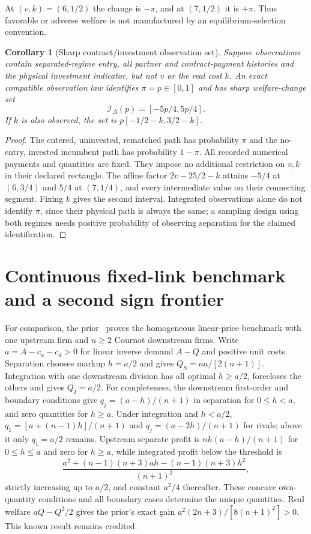 \documentclass[11pt,a4paper]{article}
\numberwithin{equation}{section}
\newtheorem{corollary}[theorem]{Corollary}
\theoremstyle{definition}
\begin{document}
At $(v,k)=(6,1/2)$ the change is $-\pi$, and at $(7,1/2)$ it is
$+\pi$. Thus favorable or adverse welfare is not manufactured by an
equilibrium-selection convention.

\begin{corollary}[Sharp contract/investment observation set]\label{cor:dynamic-data}
Suppose observations contain separated-regime entry, all partner and
contract-payment histories and the physical investment indicator, but
not $v$ or the real cost $k$. An exact compatible observation law identifies
$\pi=p\in[0,1]$ and has sharp welfare-change set
\begin{equation}\label{eq:dynamic-id}
 \mathcal I_\Delta(p)=[-5p/4,5p/4].
\end{equation}
If $k$ is also observed, the set is $p[-1/2-k,3/2-k]$.
\end{corollary}
\begin{proof}
The entered, uninvested, rematched path has probability $\pi$ and the
no-entry, invested incumbent path has probability $1-\pi$.
All recorded numerical payments and quantities are fixed. They impose
no additional restriction on $v,k$ in their declared rectangle.
The affine factor $2v-25/2-k$ attains $-5/4$ at $(6,3/4)$ and
$5/4$ at $(7,1/4)$, and every intermediate value on their connecting
segment. Fixing $k$ gives the second interval. Integrated observations
alone do not identify $\pi$, since their physical path is always the
same; a sampling design using both regimes needs positive probability
of observing separation for the claimed identification.
\end{proof}

\section{Continuous fixed-link benchmark and a second sign frontier}\label{sec:cournot}

For comparison, the prior~\cite{prior} proves the homogeneous linear-price
benchmark with one upstream firm and $n\ge2$ Cournot downstream firms.
Write $a=A-c_u-c_d>0$ for linear inverse demand $A-Q$ and positive unit
costs. Separation chooses markup $h=a/2$ and gives
$Q_S=na/[2(n+1)]$. Integration with one downstream division has all
optimal $h\ge a/2$, forecloses the others and gives $Q_I=a/2$.
For completeness, the downstream first-order and boundary conditions
give $q_j=(a-h)/(n+1)$ in separation for $0\le h<a$, and zero
quantities for $h\ge a$. Under integration and $h<a/2$,
$q_1=[a+(n-1)h]/(n+1)$ and $q_j=(a-2h)/(n+1)$ for rivals;
above it only $q_1=a/2$ remains. Upstream separate profit is
$nh(a-h)/(n+1)$ for $0\le h\le a$ and zero for $h\ge a$,
while integrated profit below the threshold is
\[
 \frac{a^2+(n-1)(n+3)ah-(n-1)(n+3)h^2}{(n+1)^2},
\]
strictly increasing up to $a/2$, and constant $a^2/4$ thereafter.
These concave own-quantity conditions and all boundary cases determine
the unique quantities. Real welfare $aQ-Q^2/2$ gives the prior's exact
gain $a^2(2n+3)/[8(n+1)^2]>0$. This known result remains credited.
\end{document}
